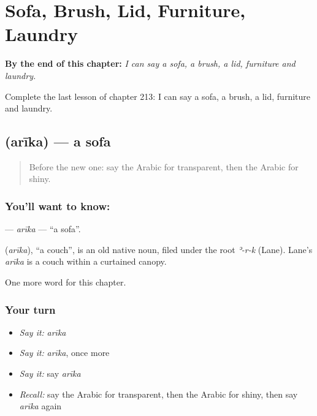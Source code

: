 
\chapter{Sofa, Brush, Lid, Furniture, Laundry}
\label{ch:ar-sofa-brush-lid-furniture-laundry}

\begin{chapteropening}
\textbf{By the end of this chapter:} \emph{I can say a sofa, a brush, a lid, furniture and laundry.}

Complete the last lesson of chapter 213: I can say a sofa, a brush, a lid, furniture and laundry.
\end{chapteropening}

\section[\texorpdfstring{\ar{أريكة} (arīka)}{أريكة (arīka)}]{ (arīka) — a sofa}

\label{lesson:AR-C213-arika}



\begin{quote}
Before the new one: say the Arabic for transparent, then the Arabic for shiny.
\end{quote}

\subsection*{You'll want to know: }
\textbf{} — \emph{arīka} — \textquotedblleft{}a sofa\textquotedblright{}.

\begin{cousinweb}
\textbf{} (\emph{arīka}), \textquotedblleft{}a couch\textquotedblright{}, is an old native noun, filed under the root \emph{ʾ-r-k} (Lane). Lane's \emph{arīka} is a couch within a curtained canopy.
\end{cousinweb}

\begin{grammarlens}[title={What you've built}]
One more word for this chapter.
\end{grammarlens}

\subsection*{Your turn}
\begin{itemize}
\raggedright
  \item \emph{Say it:} \emph{arīka}
  \item \emph{Say it:} \emph{arīka}, once more
  \item \emph{Say it:} say \emph{arīka}
  \item \emph{Recall:} say the Arabic for transparent, then the Arabic for shiny, then say \emph{arīka} again
\end{itemize}

